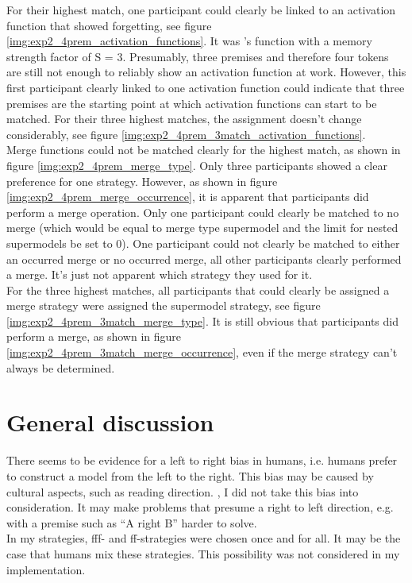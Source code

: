 \documentclass[hidelinks]{scrartcl}
\begin{document}
For their highest match, one participant could clearly be linked to an activation function that showed forgetting, see figure \ref{img:exp2_4prem_activation_functions}. It was \cite{Yffelti.2016}'s function with a memory strength factor of S = 3. Presumably, three \gls{premise}s and therefore four \gls{token}s are still not enough to reliably show an activation function at work. However, this first participant clearly linked to one activation function could indicate that three premises are the starting point at which activation functions can start to be matched. For their three highest matches, the assignment doesn't change considerably, see figure \ref{img:exp2_4prem_3match_activation_functions}. \\
Merge functions could not be matched clearly for the highest match, as shown in figure \ref{img:exp2_4prem_merge_type}. Only three participants showed a clear preference for one strategy. However, as shown in figure \ref{img:exp2_4prem_merge_occurrence}, it is apparent that participants did perform a merge operation. Only one participant could clearly be matched to no merge (which would be equal to merge type supermodel and the limit for nested supermodels be set to 0). One participant could not clearly be matched to either an occurred merge or no occurred merge, all other participants clearly performed a merge. It's just not apparent which strategy they used for it. \\
For the three highest matches, all participants that could clearly be assigned a merge strategy were assigned the supermodel strategy, see figure \ref{img:exp2_4prem_3match_merge_type}. It is still obvious that participants did perform a merge, as shown in figure \ref{img:exp2_4prem_3match_merge_occurrence}, even if the merge strategy can't always be determined.

\section{General discussion}
There seems to be evidence for a left to right bias in humans, i.e. humans prefer to construct a model from the left to the right. This bias may be caused by cultural aspects, such as reading direction. \citep{Chan.2005}, \citep{Spalek.2005} I did not take this bias into consideration. It may make problems that presume a right to left direction, e.g. with a \gls{premise} such as ``A right B'' harder to solve. \\

In my strategies, fff- and ff-strategies were chosen once and for all. It may be the case that humans mix these strategies. This possibility was not considered in my implementation.
\end{document}
